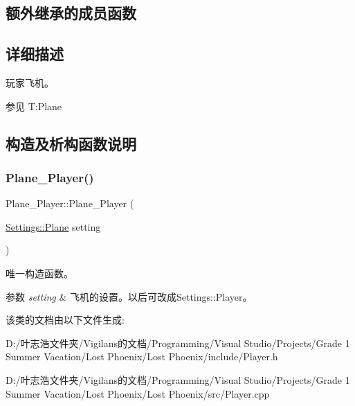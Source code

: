 \subsection*{额外继承的成员函数}


\subsection{详细描述}
玩家飞机。 

\begin{DoxySeeAlso}{参见}
T\+:\+Plane


\end{DoxySeeAlso}


\subsection{构造及析构函数说明}
\mbox{\label{class_plane___player_ae07c92eb62cd45f7fd5d12fb570934e2}} 
\subsubsection{\texorpdfstring{Plane\+\_\+\+Player()}{Plane\_Player()}}
{\footnotesize\ttfamily Plane\+\_\+\+Player\+::\+Plane\+\_\+\+Player (\begin{DoxyParamCaption}\item[{\hyperlink{struct_settings_1_1_plane}{Settings\+::\+Plane}}]{setting }\end{DoxyParamCaption})}



唯一构造函数。 


\begin{DoxyParams}{参数}
{\em setting} & 飞机的设置。以后可改成{\ttfamily Settings\+::\+Player}。 \\
\hline
\end{DoxyParams}


该类的文档由以下文件生成\+:\begin{DoxyCompactItemize}
\item 
D\+:/叶志浩文件夹/\+Vigilans的文档/\+Programming/\+Visual Studio/\+Projects/\+Grade 1 Summer Vacation/\+Lost Phoenix/\+Lost Phoenix/include/Player.\+h\item 
D\+:/叶志浩文件夹/\+Vigilans的文档/\+Programming/\+Visual Studio/\+Projects/\+Grade 1 Summer Vacation/\+Lost Phoenix/\+Lost Phoenix/src/Player.\+cpp\end{DoxyCompactItemize}

